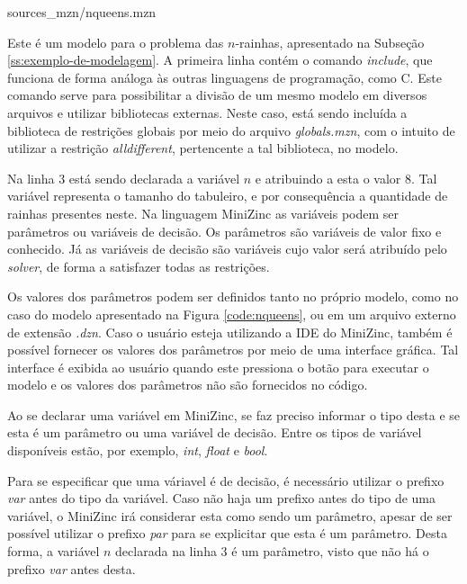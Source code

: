 
    {sources_mzn/nqueens.mzn}


Este é um modelo para o problema das $n$-rainhas, apresentado na Subseção \ref{ss:exemplo-de-modelagem}. A primeira linha contém o comando \textit{include}, que funciona de forma análoga às outras linguagens de programação, como C. Este comando serve para possibilitar a divisão de um mesmo modelo em diversos arquivos e utilizar bibliotecas externas. Neste caso, está sendo incluída a biblioteca de restrições globais por meio do arquivo \textit{globals.mzn}, com o intuito de utilizar a restrição \textit{alldifferent}, pertencente a tal biblioteca, no modelo.

Na linha 3 está sendo declarada a variável $n$ e atribuindo a esta o valor $8$. Tal variável representa o tamanho do tabuleiro, e por consequência a quantidade de rainhas presentes neste. Na linguagem MiniZinc as variáveis podem ser parâmetros ou variáveis de decisão. Os parâmetros são variáveis de valor fixo e conhecido. Já as variáveis de decisão são variáveis cujo valor será atribuído pelo \textit{solver}, de forma a satisfazer todas as restrições.

Os valores dos parâmetros podem ser definidos tanto no próprio modelo, como no caso do modelo apresentado na Figura \ref{code:nqueens}, ou em um arquivo externo de extensão \textit{.dzn}. Caso o usuário esteja utilizando a IDE do MiniZinc, também é possível fornecer os valores dos parâmetros por meio de uma interface gráfica. Tal interface é exibida ao usuário quando este pressiona o botão para executar o modelo e os valores dos parâmetros não são fornecidos no código.

Ao se declarar uma variável em MiniZinc, se faz preciso informar o tipo desta e se esta é um parâmetro ou uma variável de decisão. Entre os tipos de variável disponíveis estão, por exemplo, \textit{int}, \textit{float} e \textit{bool}.

Para se especificar que uma váriavel é de decisão, é necessário utilizar o prefixo \textit{var} antes do tipo da variável. Caso não haja um prefixo antes do tipo de uma variável, o MiniZinc irá considerar esta como sendo um parâmetro, apesar de ser possível utilizar o prefixo \textit{par} para se explicitar que esta é um parâmetro. Desta forma, a variável $n$ declarada na linha 3 é um parâmetro, visto que não há o prefixo \textit{var} antes desta.

